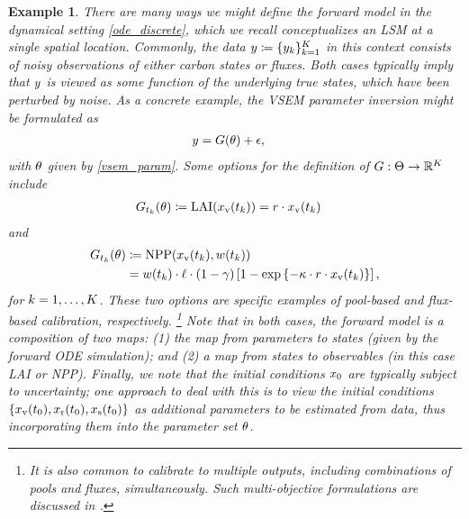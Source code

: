 \documentclass[12pt]{article}
\newtheorem{example}{Example}
\begin{document}
\begin{example} \label{ex:lsm-inv-prob}
There are many ways we might define the forward model in the dynamical setting \ref{ode_discrete}, which we recall 
conceptualizes an LSM at a single spatial location. Commonly, the data 
$y \coloneqq \{{y}_{k}\}_{k=1}^{K}$ in this context consists of noisy observations
of either carbon states or fluxes. Both cases typically imply that $y$ is viewed as some function of the underlying 
true states, which have been perturbed by noise. As a concrete example, the VSEM parameter inversion might be formulated
as 
\begin{align}
y &= G(\theta) + \epsilon,
\end{align}
with $\theta$ given by \ref{vsem_param}. Some options for the definition of $G: \Theta \to \mathbb{R}^{K}$ include
\begin{align}
G_{{t}_{k}}(\theta) 
&\coloneqq \textrm{LAI}(x_{\textrm{v}}({t}_{k})) 
= r \cdot x_{\textrm{v}}({t}_{k}) \label{lsm-fwd-state}
\end{align}
and
\begin{align}
G_{{t}_{k}}(\theta) 
&\coloneqq \textrm{NPP}(x_{\textrm{v}}({t}_{k}), w({t}_{k})) \label{lsm-fwd-flux} \\
&= w({t}_{k}) \cdot \ell \cdot (1 - \gamma) \left[1 - \exp\left\{-\kappa \cdot r \cdot x_{\textrm{v}}({t}_{k})\right\} \right], \nonumber
\end{align}
for $k = 1, \dots, K$. These two options are specific examples of pool-based and flux-based 
calibration, respectively. 
\footnote{It is also common to calibrate to multiple outputs, including combinations of pools and fluxes, simultaneously. Such multi-objective
formulations are discussed in .}
Note that in both cases, the forward model is a composition of two maps: (1) the map from parameters to 
states (given by the forward ODE simulation); and (2) a map from states to observables (in this case LAI or NPP).   
Finally, we note that the initial conditions 
$x_{0}$ are typically subject to uncertainty; one approach to deal with this is to view the initial conditions
$\left\{x_{\textrm{v}}({t}_{0}), x_{\textrm{r}}({t}_{0}), x_{\textrm{s}}({t}_{0})\right\}$ as additional parameters to be estimated 
from data, thus incorporating them into the parameter set $\theta$. 
\end{example}
\end{document}

